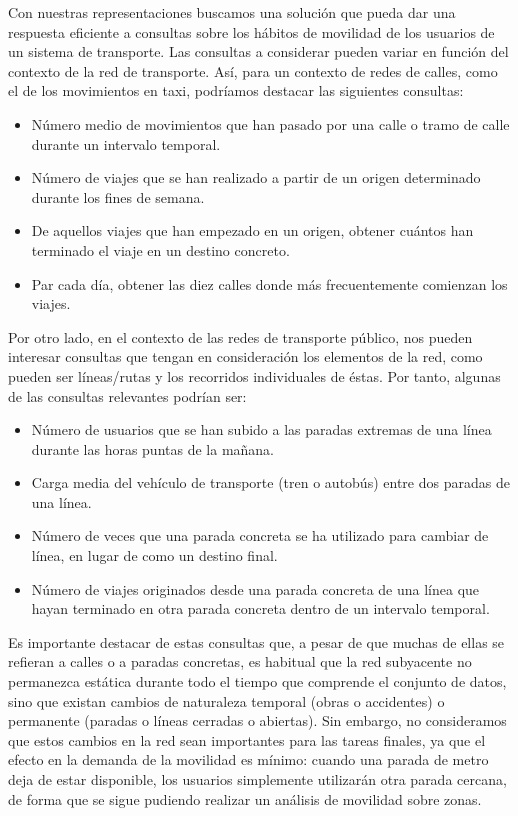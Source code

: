     Con nuestras representaciones buscamos una soluci\'on que pueda dar una respuesta eficiente a consultas sobre los h\'abitos de movilidad de los usuarios de un sistema de transporte. Las consultas a considerar pueden variar en funci\'on del contexto de la red de transporte. As\'i, para un contexto de redes de calles, como el de los movimientos en taxi, podr\'iamos destacar las siguientes consultas:
    
    \begin{itemize}
        \item N\'umero medio de movimientos que han pasado por una calle o tramo de calle durante un intervalo temporal.
        \item N\'umero de viajes que se han realizado a partir de un origen determinado durante los fines de semana.
        \item De aquellos viajes que han empezado en un origen, obtener cu\'antos han terminado el viaje en un destino concreto.
        \item Par cada d\'ia, obtener las diez calles donde m\'as frecuentemente comienzan los viajes.
    \end{itemize}
    
    Por otro lado, en el contexto de las redes de transporte p\'ublico, nos pueden interesar consultas que tengan en consideraci\'on los elementos de la red, como pueden ser l\'ineas/rutas y los recorridos individuales de \'estas. Por tanto, algunas de las consultas relevantes podr\'ian ser:
    
    \begin{itemize}
        \item N\'umero de usuarios que se han subido a las paradas extremas de una l\'inea durante las horas puntas de la ma\~nana.
        \item Carga media del veh\'iculo de transporte (tren o autob\'us) entre dos paradas de una l\'inea.
        \item N\'umero de veces que una parada concreta se ha utilizado para cambiar de l\'inea, en lugar de como un destino final.
        \item N\'umero de viajes originados desde una parada concreta de una l\'inea que hayan terminado en otra parada concreta dentro de un intervalo temporal.
    \end{itemize}
    
    Es importante destacar de estas consultas que, a pesar de que muchas de ellas se refieran a calles o a paradas concretas, es habitual que la red subyacente no permanezca est\'atica durante todo el tiempo que comprende el conjunto de datos, sino que existan cambios de naturaleza temporal (obras o accidentes) o permanente (paradas o l\'ineas cerradas o abiertas).  Sin embargo, no consideramos que estos cambios en la red sean importantes para las tareas finales, ya que el efecto en la demanda de la movilidad es m\'inimo: cuando una parada de metro deja de estar disponible, los usuarios simplemente utilizar\'an otra parada cercana, de forma que se sigue pudiendo realizar un an\'alisis de movilidad sobre zonas.
    
